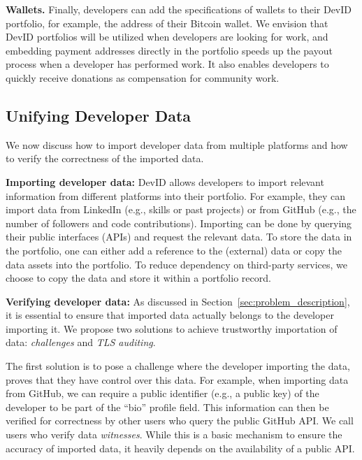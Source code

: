 \textbf{Wallets.}
Finally, developers can add the specifications of wallets to their DevID portfolio, for example, the address of their Bitcoin wallet.
We envision that DevID portfolios will be utilized when developers are looking for work, and embedding payment addresses directly in the portfolio speeds up the payout process when a developer has performed work.
It also enables developers to quickly receive donations as compensation for community work.

\subsection{Unifying Developer Data}
\label{subsec:unifying_data}
We now discuss how to import developer data from multiple platforms and how to verify the correctness of the imported data.

\textbf{Importing developer data:}
DevID allows developers to import relevant information from different platforms into their portfolio.
For example, they can import data from LinkedIn (e.g., skills or past projects) or from GitHub (e.g., the number of followers and code contributions).
Importing can be done by querying their public interfaces (APIs) and request the relevant data.
To store the data in the portfolio, one can either add a reference to the (external) data or copy the data assets into the portfolio.
To reduce dependency on third-party services, we choose to copy the data and store it within a portfolio record.

\textbf{Verifying developer data:}
As discussed in Section~\ref{sec:problem_description}, it is essential to ensure that imported data actually belongs to the developer importing it.
We propose two solutions to achieve trustworthy importation of data: \textit{challenges} and \textit{TLS auditing}.

The first solution is to pose a challenge where the developer importing the data, proves that they have control over this data.
For example, when importing data from GitHub, we can require a public identifier (e.g., a public key) of the developer to be part of the \enquote{bio} profile field.
This information can then be verified for correctness by other users who query the public GitHub API.
We call users who verify data \emph{witnesses}.
While this is a basic mechanism to ensure the accuracy of imported data, it heavily depends on the availability of a public API.

